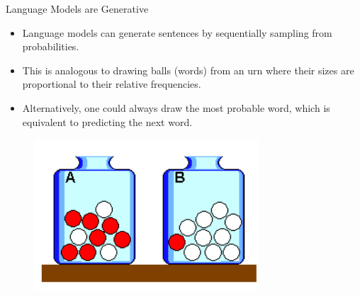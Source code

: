 \documentclass[handout]{beamer}
\begin{document}
\begin{frame}{Language Models are Generative}
\begin{scriptsize}
\begin{itemize}
 \item Language models can generate sentences by sequentially sampling from probabilities.

  \item This is analogous to drawing balls (words) from an urn where their sizes are proportional to their relative frequencies.

 \item Alternatively, one could always draw the most probable word, which is equivalent to predicting the next word.
\end{itemize}


\end{scriptsize}

\begin{figure}[h]
\includegraphics[scale = 0.6]{pics/lmsampling.png}
\end{figure}


\end{frame}
 
\end{document}
